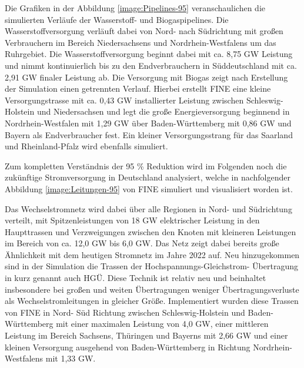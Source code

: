 Die Grafiken in der Abbildung \ref{image:Pipelines-95} veranschaulichen die simulierten Verläufe der Wasserstoff- und Biogaspipelines. Die Wasserstoffversorgung verläuft dabei von Nord- nach Südrichtung mit großen Verbrauchern im Bereich Niedersachsens und Nordrhein-Westfalens um das Ruhrgebiet. Die Wasserstoffversorgung beginnt dabei mit ca. 8,75 GW Leistung und nimmt kontinuierlich bis zu den Endverbrauchern in Süddeutschland mit ca. 2,91 GW finaler Leistung ab. Die Versorgung mit Biogas zeigt nach Erstellung der Simulation einen getrennten Verlauf. Hierbei erstellt FINE eine kleine Versorgungstrasse mit ca. 0,43 GW installierter Leistung zwischen Schleswig-Holstein und Niedersachsen und legt die große Energieversorgung beginnend in Nordrhein-Westfalen mit 1,29 GW über Baden-Württemberg mit 0,86 GW und Bayern als Endverbraucher fest. Ein kleiner Versorgungsstrang für das Saarland und Rheinland-Pfalz wird ebenfalls simuliert.

Zum kompletten Verständnis der 95 \% Reduktion wird im Folgenden noch die zukünftige Stromversorgung in Deutschland analysiert, welche in nachfolgender Abbildung \ref{image:Leitungen-95} von FINE simuliert und visualisiert worden ist.

Das Wechselstromnetz wird dabei über alle Regionen in Nord- und Südrichtung verteilt, mit Spitzenleistungen von 18 GW elektrischer Leistung in den Haupttrassen und Verzweigungen zwischen den Knoten mit kleineren Leistungen im Bereich von ca. 12,0 GW bis 6,0 GW. Das Netz zeigt dabei bereits große Ähnlichkeit mit dem heutigen Stromnetz im Jahre 2022 auf. Neu hinzugekommen sind in der Simulation die Trassen der Hochspannungs-Gleichstrom- Übertragung in kurz genannt auch HGÜ. Diese Technik ist relativ neu und beinhaltet insbesondere bei großen und weiten Übertragungen weniger Übertragungs\-verluste als Wechselstromleitungen in gleicher Größe. Implementiert wurden diese Trassen von FINE in Nord- Süd Richtung zwischen Schleswig-Holstein und Baden-Württemberg mit einer maximalen Leistung von 4,0 GW, einer mittleren Leistung im Bereich Sachsens, Thüringen und Bayerns mit 2,66 GW und einer kleinen Versorgung ausgehend von Baden-Württemberg in Richtung Nordrhein-Westfalens mit 1,33 GW.

